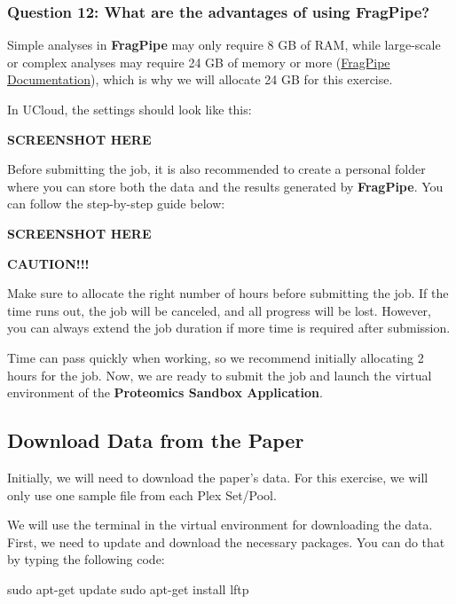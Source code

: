 \documentclass[
  letterpaper,
  DIV=11,
  numbers=noendperiod]{scrartcl}
\newenvironment{Shaded}{\begin{snugshade}}{\end{snugshade}}
\newcommand{\FunctionTok}[1]{\textcolor[rgb]{0.28,0.35,0.67}{#1}}
\newcommand{\NormalTok}[1]{\textcolor[rgb]{0.00,0.23,0.31}{#1}}
\begin{document}
\subsubsection{Question 12: What are the advantages of using
FragPipe?}\label{question-12-what-are-the-advantages-of-using-fragpipe}

Simple analyses in \textbf{FragPipe} may only require 8 GB of RAM, while
large-scale or complex analyses may require 24 GB of memory or more
(\href{https://fragpipe.nesvilab.org/docs/tutorial_fragpipe.html\#:~:text=FragPipe\%20runs\%20on\%20Windows\%20and,24\%20GB\%20memory\%20or\%20more.}{FragPipe
Documentation}), which is why we will allocate 24 GB for this exercise.

In UCloud, the settings should look like this:

\textbf{SCREENSHOT HERE}

Before submitting the job, it is also recommended to create a personal
folder where you can store both the data and the results generated by
\textbf{FragPipe}. You can follow the step-by-step guide below:

\textbf{SCREENSHOT HERE}

\textbf{CAUTION!!!}

Make sure to allocate the right number of hours before submitting the
job. If the time runs out, the job will be canceled, and all progress
will be lost. However, you can always extend the job duration if more
time is required after submission.

Time can pass quickly when working, so we recommend initially allocating
2 hours for the job. Now, we are ready to submit the job and launch the
virtual environment of the \textbf{Proteomics Sandbox Application}.

\subsection{Download Data from the
Paper}\label{download-data-from-the-paper}

Initially, we will need to download the paper's data. For this exercise,
we will only use one sample file from each Plex Set/Pool.

We will use the terminal in the virtual environment for downloading the
data. First, we need to update and download the necessary packages. You
can do that by typing the following code:

\begin{Shaded}
\begin{Highlighting}[]
\FunctionTok{sudo}\NormalTok{ apt{-}get update}
\FunctionTok{sudo}\NormalTok{ apt{-}get install lftp}
\end{Highlighting}
\end{Shaded}
\end{document}
